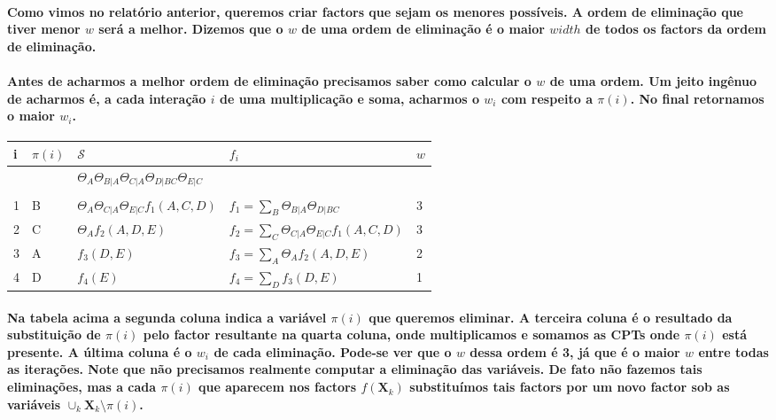 \documentclass[a4paper,10pt]{article}
\theoremstyle{plain}
\begin{document}
\paragraph{
  Como vimos no relatório anterior\cite{report-2}, queremos criar factors que sejam os menores 
  possíveis. A ordem de eliminação que tiver menor $w$ será a melhor. Dizemos que o $w$ de uma 
  ordem de eliminação é o maior $width$ de todos os factors da ordem de eliminação. 
}

\paragraph{
  Antes de acharmos a melhor ordem de eliminação precisamos saber como calcular o $w$ de uma ordem.
  Um jeito ingênuo de acharmos é, a cada interação $i$ de uma multiplicação e soma, acharmos o 
  $w_i$ com respeito a $\pi(i)$. No final retornamos o maior $w_i$. 
}

\begin{table}[h]
  \begin{center}
    \begin{tabular}{*{4}{l|} l}
      i & $\pi(i)$ & $\mathcal{S}$ & $f_i$ & $w$ \\
      \hline
      & & $\Theta_A \Theta_{B|A} \Theta_{C|A} \Theta_{D|BC} \Theta_{E|C}$ & & \\
      & & & & \\
      1 & B & $\Theta_A \Theta_{C|A} \Theta_{E|C} f_1(A, C, D)$ & $f_1 = \sum_B \Theta_{B|A} \Theta_{D|BC}$ & 3 \\
      2 & C & $\Theta_A f_2(A, D, E)$ & $f_2 = \sum_C \Theta_{C|A} \Theta_{E|C} f_1(A, C, D)$ & 3 \\
      3 & A & $f_3(D, E)$ & $f_3 = \sum_A \Theta_A f_2(A, D, E)$ & 2 \\
      4 & D & $f_4(E)$ & $f_4 = \sum_D f_3(D, E)$ & 1 \\
    \end{tabular}
  \end{center}
\end{table}

\paragraph{
  Na tabela acima a segunda coluna indica a variável $\pi(i)$ que queremos eliminar. A terceira 
  coluna é o resultado da substituição de $\pi(i)$ pelo factor resultante na quarta coluna, onde
  multiplicamos e somamos as CPTs onde $\pi(i)$ está presente. A última coluna é o $w_i$ de cada
  eliminação. Pode-se ver que o $w$ dessa ordem é 3, já que é o maior $w$ entre todas as iterações.
  Note que não precisamos realmente computar a eliminação das variáveis. De fato não fazemos tais
  eliminações, mas a cada $\pi(i)$ que aparecem nos factors $f(\textbf{X}_k)$ substituímos tais
  factors por um novo factor sob as variáveis $\cup_k \textbf{X}_k \setminus {\pi(i)}$.
}
\end{document}
